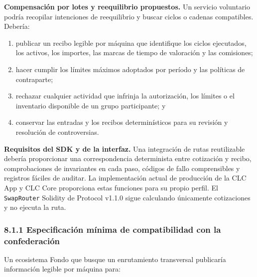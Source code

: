 \documentclass[11pt]{article}
\begin{document}
\textbf{Compensación por lotes y reequilibrio propuestos.} Un servicio voluntario podría recopilar intenciones de reequilibrio y buscar ciclos o cadenas compatibles. Debería:

\begin{enumerate}[leftmargin=*]
\item publicar un recibo legible por máquina que identifique los ciclos ejecutados, los activos, los importes, las marcas de tiempo de valoración y las comisiones;
\item hacer cumplir los límites máximos adoptados por período y las políticas de contraparte;
\item rechazar cualquier actividad que infrinja la autorización, los límites o el inventario disponible de un grupo participante; y
\item conservar las entradas y los recibos determinísticos para su revisión y resolución de controversias.
\end{enumerate}
\textbf{Requisitos del SDK y de la interfaz.} Una integración de rutas reutilizable debería proporcionar una correspondencia determinista entre cotización y recibo, comprobaciones de invariantes en cada paso, códigos de fallo comprensibles y registros fáciles de auditar. La implementación actual de producción de la CLC App y CLC Core proporciona estas funciones para su propio perfil. El \texttt{SwapRouter} Solidity de Protocol v1.1.0 sigue calculando únicamente cotizaciones y no ejecuta la ruta.

\subsubsection*{8.1.1 Especificación mínima de compatibilidad con la confederación}

Un ecosistema Fondo que busque un enrutamiento transversal publicaría información legible por máquina para:
\end{document}
